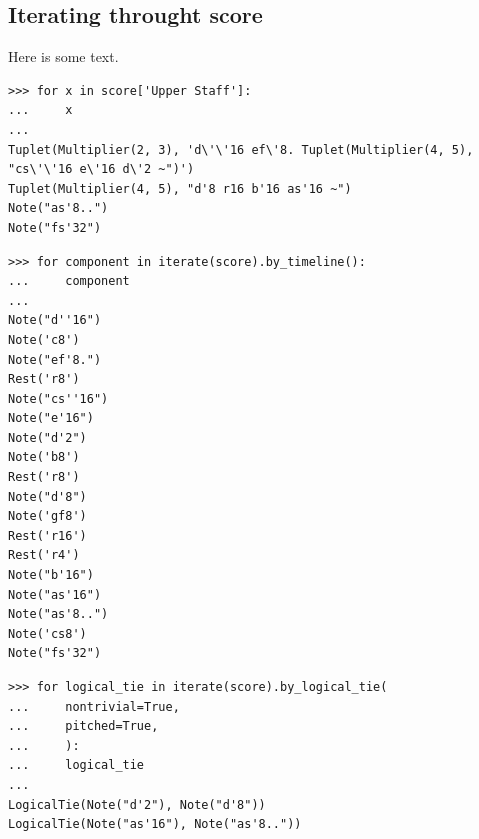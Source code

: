 \subsection{Iterating throught score}

Here is some text.

\begin{lstlisting}
>>> for x in score['Upper Staff']:
...     x
... 
Tuplet(Multiplier(2, 3), 'd\'\'16 ef\'8. Tuplet(Multiplier(4, 5), "cs\'\'16 e\'16 d\'2 ~")')
Tuplet(Multiplier(4, 5), "d'8 r16 b'16 as'16 ~")
Note("as'8..")
Note("fs'32")
\end{lstlisting}


\begin{lstlisting}
>>> for component in iterate(score).by_timeline():
...     component
... 
Note("d''16")
Note('c8')
Note("ef'8.")
Rest('r8')
Note("cs''16")
Note("e'16")
Note("d'2")
Note('b8')
Rest('r8')
Note("d'8")
Note('gf8')
Rest('r16')
Rest('r4')
Note("b'16")
Note("as'16")
Note("as'8..")
Note('cs8')
Note("fs'32")
\end{lstlisting}


\begin{lstlisting}
>>> for logical_tie in iterate(score).by_logical_tie(
...     nontrivial=True,
...     pitched=True,
...     ):
...     logical_tie
... 
LogicalTie(Note("d'2"), Note("d'8"))
LogicalTie(Note("as'16"), Note("as'8.."))
\end{lstlisting}

